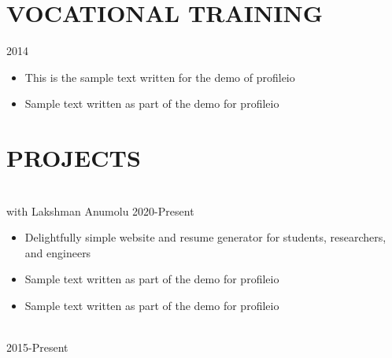 \documentclass{res}
\begin{document}
\begin{resume}
	
	
	\section{\MakeUppercase{Vocational Training}} \vskip 0.15in
	
	\hspace*{-0.25in}{\bf Trainee} \hfill 2014 \\
	\hspace*{-0.25in}{\it Animation Studios}
	\begin{itemize}[leftmargin=\parindent]
	\setlength{\itemsep}{0mm} \smallskip
	
		\item This is the sample text written for the demo of profileio
		\item Sample text written as part of the demo for profileio
	\end{itemize}
	
	
		
	
	\section{\MakeUppercase{Projects}} \vskip 0.15in
	
	\hspace*{-0.25in}{\bf ProfileIO} \\
	\hspace*{-0.25in}with Lakshman Anumolu \hfill 2020-Present
	\begin{itemize}[leftmargin=\parindent]
	\setlength{\itemsep}{0mm} \smallskip
	
	\item Delightfully simple website and resume generator for students, researchers, and engineers
	\item Sample text written as part of the demo for profileio
	\item Sample text written as part of the demo for profileio
	\end{itemize}
	
	\hspace*{-0.25in}{\bf Project VI} \\
	\hspace*{-0.25in} \hfill 2015-Present
	\begin{itemize}[leftmargin=\parindent]
	\setlength{\itemsep}{0mm} \smallskip
	

\end{itemize}
\end{resume}
\end{document}
